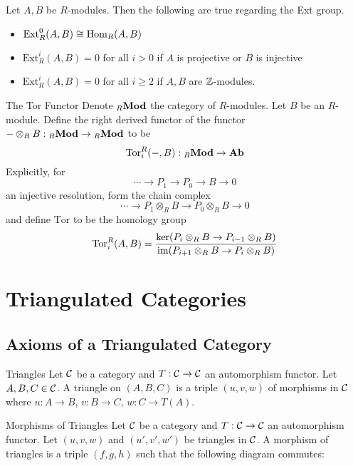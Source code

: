 \documentclass[a4paper]{article}
\begin{document}
\begin{thm}{}{} Let $A,B$ be $R$-modules. Then the following are true regarding the Ext group. 
\begin{itemize}
\item $\text{Ext}_R^0(A,B)\cong\operatorname{Hom}_R(A,B)$
\item $\text{Ext}_R^i(A,B)=0$ for all $i>0$ if $A$ is projective or $B$ is injective
\item $\text{Ext}_R^i(A,B)=0$ for all $i\geq 2$ if $A,B$ are $\mathbb{Z}$-modules. 
\end{itemize}
\end{thm}

\begin{defn}{The Tor Functor}{} Denote $_R\bold{Mod}$ the category of $R$-modules. Let $B$ be an $R$-module. Define the right derived functor of the functor $-\otimes_RB:{ _R\bold{Mod}}\to{_R\bold{Mod}}$ to be $$\text{Tor}_i^R(-,B):{_R\bold{Mod}}\to\bold{Ab}$$ Explicitly, for $$\cdots\to P_1\to P_0\to B\to 0$$ an injective resolution, form the chain complex $$\cdots\to P_1\otimes_RB\to P_0\otimes_RB\to 0$$ and define $\text{Tor}$ to be the homology group $$\text{Tor}_i^R(A,B)=\frac{\ker(P_i\otimes_RB\to P_{i-1}\otimes_RB)}{\operatorname{im}(P_{i+1}\otimes_RB\to P_i\otimes_RB)}$$
\end{defn}

\pagebreak
\section{Triangulated Categories}
\subsection{Axioms of a Triangulated Category}
\begin{defn}{Triangles}{} Let $\mathcal{C}$ be a category and $T:\mathcal{C}\to\mathcal{C}$ an automorphism functor. Let $A,B,C\in\mathcal{C}$. A triangle on $(A,B,C)$ is a triple $(u,v,w)$ of morphisms in $\mathcal{C}$ where $u:A\to B$, $v:B\to C$, $w:C\to T(A)$. 
\end{defn}

\begin{defn}{Morphisms of Triangles}{} Let $\mathcal{C}$ be a category and $T:\mathcal{C}\to\mathcal{C}$ an automorphism functor. Let $(u,v,w)$ and $(u',v',w')$ be triangles in $\mathcal{C}$. A morphism of triangles is a triple $(f,g,h)$ such that the following diagram commutes: \\~\\
\\~\\
\end{defn}
\end{document}
